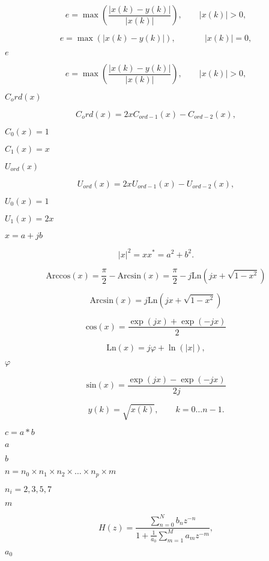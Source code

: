 \documentclass{article}
\begin{document}
\[ e = \max \left( \frac{|x(k) - y(k)| }{ |x(k)|} \right), \quad \quad |x(k)| > 0, \]
\pagebreak

\[ e = \max(|x(k) - y(k)| ), ~\qquad \quad~|x(k)| = 0, \]
\pagebreak

$ e$
\pagebreak

\[ e = \max \left( \frac{|x(k) - y(k)|}{|x(k)|} \right), \quad \quad |x(k)| > 0, \]
\pagebreak

$ C_ord(x)$
\pagebreak

\[ C_ord(x) = 2 x C_{ord-1}(x) - C_{ord-2}(x), \]
\pagebreak

$ C_0(x) = 1 $
\pagebreak

$ C_1(x) = x$
\pagebreak

$ U_{ord}(x)$
\pagebreak

\[ U_{ord}(x) = 2 x U_{ord-1}(x) - U_{ord-2}(x), \]
\pagebreak

$ U_0(x) = 1 $
\pagebreak

$ U_1(x) = 2x$
\pagebreak

$ x = a + j b $
\pagebreak

\[ |x|^2 = x x^* = a^2 + b^2. \]
\pagebreak

\[ \textrm{Arccos}(x) = \frac{\pi}{2} - \textrm{Arcsin}(x) = \frac{\pi}{2} -j \textrm{Ln}\left( j x + \sqrt{1 - x^2} \right) \]
\pagebreak

\[ \textrm{Arcsin}(x) = j \textrm{Ln}\left( j x + \sqrt{1 - x^2} \right) \]
\pagebreak

\[ \textrm{cos}(x) = \frac{\exp(jx) + \exp(-jx)}{2} \]
\pagebreak

\[ \textrm{Ln}(x) = j \varphi + \ln(|x|), \]
\pagebreak

$\varphi$
\pagebreak

\[ \textrm{sin}(x) = \frac{\exp(jx) - \exp(-jx)}{2j} \]
\pagebreak

\[ y(k) = \sqrt{x(k)}, \qquad k = 0 \ldots n-1. \]
\pagebreak

$ c = a * b$
\pagebreak

$a$
\pagebreak

$b$
\pagebreak

$n = n_0 \times n_1 \times n_2 \times \ldots \times n_p \times m$
\pagebreak

$n_i = 2,3,5,7$
\pagebreak

$m $
\pagebreak

\[ H(z) = \frac{\sum_{n = 0}^{N} b_n z^{-n}} {1+{\frac{1}{a_0}}\sum_{m = 1}^{M} a_m z^{-m}}, \]
\pagebreak

$a_0$
\pagebreak
\end{document}
